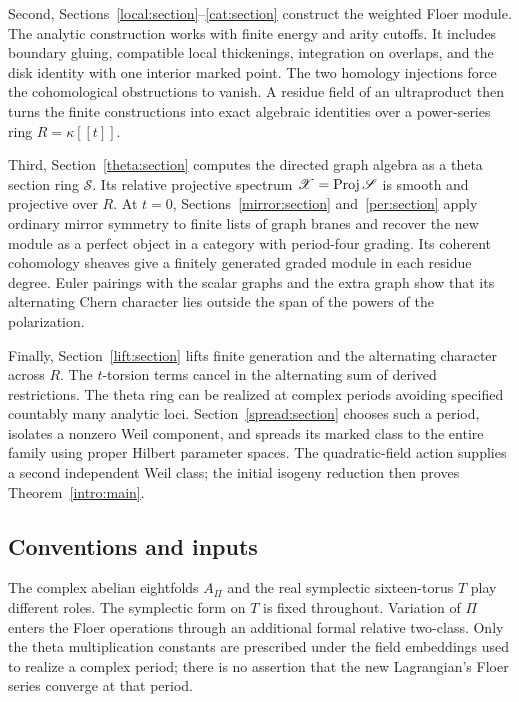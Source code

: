 Second, Sections~\ref{local:section}--\ref{cat:section} construct the
weighted Floer module.  The analytic construction works with finite
energy and arity cutoffs.  It includes boundary gluing, compatible local
thickenings, integration on overlaps, and the disk identity with one
interior marked point.  The two homology injections force the
cohomological obstructions to vanish.  A residue field of an ultraproduct
then turns the finite constructions into exact algebraic identities over
a power-series ring $R=\kappa[[t]]$.

Third, Section~\ref{theta:section} computes the directed graph algebra
as a theta section ring $\mathscr S$.  Its relative projective spectrum
$\mathscr X=\operatorname{Proj}\mathscr S$ is smooth and projective over $R$.
At $t=0$, Sections~\ref{mirror:section} and~\ref{per:section} apply
ordinary mirror symmetry to finite lists of graph branes and recover
the new module as a perfect object in a category with period-four
grading.  Its coherent cohomology sheaves give a finitely generated
graded module in each residue degree.  Euler pairings with the scalar
graphs and the extra graph show that its alternating Chern character
lies outside the span of the powers of the polarization.

Finally, Section~\ref{lift:section} lifts finite generation and the
alternating character across $R$.  The $t$-torsion terms cancel in the
alternating sum of derived restrictions.  The theta ring can be realized
at complex periods avoiding specified countably many analytic loci.
Section~\ref{spread:section} chooses such a period, isolates a nonzero
Weil component, and spreads its marked class to the entire family using
proper Hilbert parameter spaces.  The quadratic-field action supplies
a second independent Weil class; the initial isogeny reduction then
proves Theorem~\ref{intro:main}.

\subsection{Conventions and inputs}

The complex abelian eightfolds $A_\Pi$ and the real symplectic
sixteen-torus $T$ play different roles.  The symplectic form on $T$ is
fixed throughout.  Variation of $\Pi$ enters the Floer operations through
an additional formal relative two-class.  Only the theta multiplication
constants are prescribed under the field embeddings used to realize a
complex period; there is no assertion that the new Lagrangian's Floer
series converge at that period.

